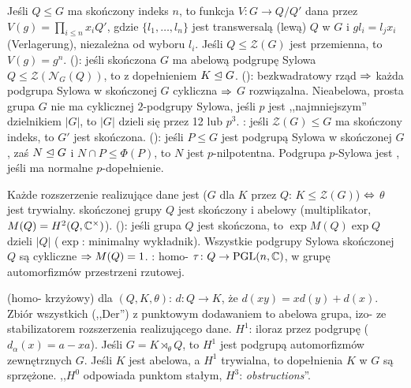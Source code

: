 Jeśli  $Q \le G$ ma skończony indeks $n$,  to funkcja $V \colon G \to Q / Q'$ dana przez $V(g) = \prod_{i \le n} x_i Q'$, gdzie $\{l_1, \ldots, l_n\}$ jest transwersalą (lewą) $Q$ w $G$ i $gl_i = l_jx_i$ (Verlagerung), niezależna od wyboru $l_i$.
Jeśli $Q \le \mathcal Z(G)$ jest przemienna, to $V(g) = g^n$.
 (): jeśli skończona $G$ ma abelową podgrupę Sylowa $Q \le \mathcal Z(\mathcal N_G(Q))$, to z dopełnieniem $K \trianglelefteq G$.
 (): bezkwadratowy rząd $\Rightarrow$ każda podgrupa Sylowa w skończonej $G$ cykliczna $\Rightarrow$ $G$ rozwiązalna. 
Nieabelowa, prosta grupa $G$ nie ma cyklicznej $2$-podgrupy Sylowa, jeśli $p$ jest ,,najmniejszym'' dzielnikiem $|G|$, to $|G|$ dzieli się przez 12 lub $p^3$.
: jeśli $\mathcal Z(G) \le G$ ma skończony indeks, to $G'$ jest skończona.
 (): jeśli $P \le G$ jest podgrupą Sylowa w skończonej $G$, zaś $N \trianglelefteq G$ i $N \cap P \le \Phi(P)$, to $N$ jest $p$-nilpotentna.
Podgrupa $p$-Sylowa jest , jeśli ma normalne $p$-dopełnienie.

Każde  rozszerzenie realizujące dane jest  ($G$ dla $K$ przez $Q$: $K \le \mathcal Z(G)$) $\Leftrightarrow$ $\theta$ jest trywialny.
 skończonej grupy $Q$ jest skończony i abelowy (multiplikator, $M(Q) = H^2(Q, \mathbb{C}^\times)$).
 (): jeśli grupa $Q$ jest skończona, to $\exp M (Q)\exp Q$ dzieli $|Q|$ ($\exp$: minimalny wykładnik).
Wszystkie podgrupy Sylowa skończonej $Q$ są cykliczne $\Rightarrow M(Q) = 1$.
: homo- $\tau \colon Q \to \textrm{PGL}(n, \mathbb{C})$, w grupę automorfizmów przestrzeni rzutowej.

  (homo- krzyżowy) dla $(Q, K, \theta)$: $d \colon Q \to K$, że $d(xy) = xd(y) + d(x)$.
Zbiór wszystkich (,,Der'') z punktowym dodawaniem to abelowa grupa, izo- ze stabilizatorem rozszerzenia realizującego dane.
 $H^1$: iloraz przez podgrupę  ($d_\alpha (x) = a - xa$).
Jeśli $G = K \rtimes_\theta Q$, to $H^1$ jest podgrupą automorfizmów zewnętrznych $G$.
Jeśli $K$ jest abelowa, a $H^1$ trywialna, to dopełnienia $K$ w $G$ są sprzężone.
,,$H^0$ odpowiada punktom stałym, $H^3$: \emph{obstructions}''.